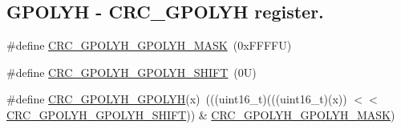 \subsection*{G\+P\+O\+L\+YH -\/ C\+R\+C\+\_\+\+G\+P\+O\+L\+YH register.}
\begin{DoxyCompactItemize}
\item 
\#define \mbox{\hyperlink{group___c_r_c___register___masks_ga15ab1d296a857eebfbb3e5894ddd9302}{C\+R\+C\+\_\+\+G\+P\+O\+L\+Y\+H\+\_\+\+G\+P\+O\+L\+Y\+H\+\_\+\+M\+A\+SK}}~(0x\+F\+F\+F\+F\+U)
\item 
\#define \mbox{\hyperlink{group___c_r_c___register___masks_ga62fa126178d7137b39b75ad2d63edae9}{C\+R\+C\+\_\+\+G\+P\+O\+L\+Y\+H\+\_\+\+G\+P\+O\+L\+Y\+H\+\_\+\+S\+H\+I\+FT}}~(0\+U)
\item 
\#define \mbox{\hyperlink{group___c_r_c___register___masks_gaf8f26eea960e536b264b1a5b1d494b07}{C\+R\+C\+\_\+\+G\+P\+O\+L\+Y\+H\+\_\+\+G\+P\+O\+L\+YH}}(x)~(((uint16\+\_\+t)(((uint16\+\_\+t)(x)) $<$$<$ \mbox{\hyperlink{group___c_r_c___register___masks_ga62fa126178d7137b39b75ad2d63edae9}{C\+R\+C\+\_\+\+G\+P\+O\+L\+Y\+H\+\_\+\+G\+P\+O\+L\+Y\+H\+\_\+\+S\+H\+I\+FT}})) \& \mbox{\hyperlink{group___c_r_c___register___masks_ga15ab1d296a857eebfbb3e5894ddd9302}{C\+R\+C\+\_\+\+G\+P\+O\+L\+Y\+H\+\_\+\+G\+P\+O\+L\+Y\+H\+\_\+\+M\+A\+SK}})
\end{DoxyCompactItemize}
